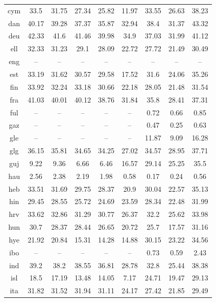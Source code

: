\begin{table}[htb]
\begin{tabular}{@{}ccccccccc@{}}
        cym & 33.5 & 31.75 & 27.34 & 25.82 & 11.97 & 33.55 & 26.63 & 38.23 \\
        dan & 40.17 & 39.28 & 37.37 & 35.87 & 32.94 & 38.4 & 31.37 & 43.32 \\
        deu & 42.33 & 41.6 & 41.46 & 39.98 & 34.9 & 37.03 & 31.99 & 41.12 \\
        ell & 32.33 & 31.23 & 29.1 & 28.09 & 22.72 & 27.72 & 21.49 & 30.49 \\
        eng & -- & -- & -- & -- & -- & -- & -- & -- \\
        est & 33.19 & 31.62 & 30.57 & 29.58 & 17.52 & 31.6 & 24.06 & 35.26 \\
        fin & 33.92 & 32.24 & 33.18 & 30.66 & 22.18 & 28.05 & 21.48 & 31.54 \\
        fra & 41.03 & 40.01 & 40.12 & 38.76 & 31.84 & 35.8 & 28.41 & 37.31 \\
        ful & -- & -- & -- & -- & -- & 0.72 & 0.66 & 0.85 \\
        gaz & -- & -- & -- & -- & -- & 0.47 & 0.25 & 0.63 \\
        gle & -- & -- & -- & -- & -- & 11.87 & 9.09 & 16.28 \\
        glg & 36.15 & 35.81 & 34.65 & 34.25 & 27.02 & 34.57 & 28.95 & 37.71 \\
        guj & 9.22 & 9.36 & 6.66 & 6.46 & 16.57 & 29.14 & 25.25 & 35.5 \\
        hau & 2.56 & 2.38 & 2.19 & 1.98 & 0.58 & 0.17 & 0.24 & 0.56 \\
        heb & 33.51 & 31.69 & 29.75 & 28.37 & 20.9 & 30.04 & 22.57 & 35.13 \\
        hin & 29.45 & 28.55 & 25.72 & 24.69 & 23.59 & 28.34 & 22.48 & 31.99 \\
        hrv & 33.62 & 32.86 & 31.29 & 30.77 & 26.37 & 32.2 & 25.62 & 33.98 \\
        hun & 30.7 & 28.37 & 28.44 & 26.65 & 20.72 & 25.7 & 17.57 & 31.16 \\
        hye & 21.92 & 20.84 & 15.31 & 14.28 & 14.88 & 30.15 & 23.22 & 34.56 \\
        ibo & -- & -- & -- & -- & -- & 0.73 & 0.59 & 2.43 \\
        ind & 39.2 & 38.2 & 38.55 & 36.81 & 28.78 & 32.8 & 25.44 & 38.38 \\
        isl & 18.5 & 17.19 & 13.48 & 14.05 & 7.17 & 24.71 & 19.47 & 29.13 \\
        ita & 31.82 & 31.52 & 31.94 & 31.11 & 24.17 & 27.42 & 21.85 & 29.49 \\

\end{tabular}
\end{table}
